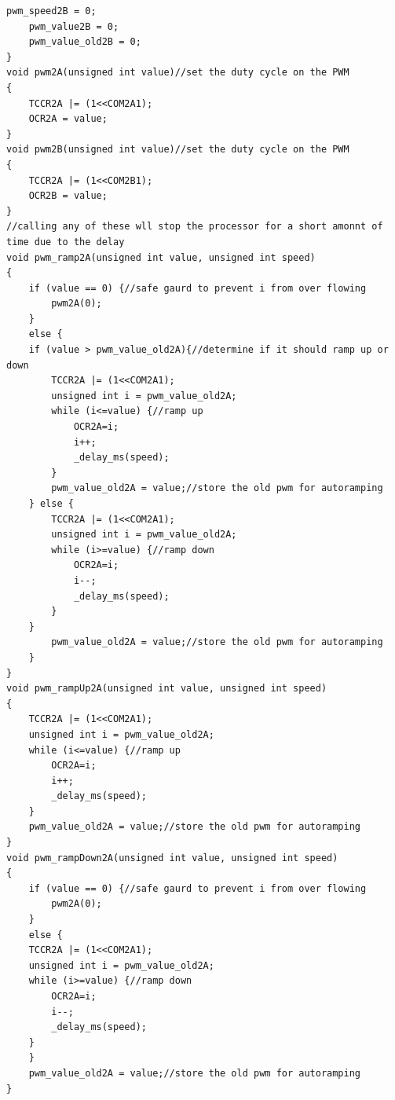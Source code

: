 \documentclass{article}
\begin{document}
\begin{lstlisting}[caption={The PWM function library.},label=pwm,frame=tbl]
    pwm_speed2B = 0;
    pwm_value2B = 0;
    pwm_value_old2B = 0;
}
void pwm2A(unsigned int value)//set the duty cycle on the PWM
{
    TCCR2A |= (1<<COM2A1);
    OCR2A = value;
}
void pwm2B(unsigned int value)//set the duty cycle on the PWM
{
    TCCR2A |= (1<<COM2B1);
    OCR2B = value;
}
//calling any of these wll stop the processor for a short amonnt of time due to the delay
void pwm_ramp2A(unsigned int value, unsigned int speed)
{
    if (value == 0) {//safe gaurd to prevent i from over flowing
        pwm2A(0);
    }
    else {
    if (value > pwm_value_old2A){//determine if it should ramp up or down
        TCCR2A |= (1<<COM2A1);
        unsigned int i = pwm_value_old2A;
        while (i<=value) {//ramp up
            OCR2A=i;
            i++;
            _delay_ms(speed);
        }
        pwm_value_old2A = value;//store the old pwm for autoramping
    } else {
        TCCR2A |= (1<<COM2A1);
        unsigned int i = pwm_value_old2A;
        while (i>=value) {//ramp down
            OCR2A=i;
            i--;
            _delay_ms(speed);
        }
    }
        pwm_value_old2A = value;//store the old pwm for autoramping
    }
}
void pwm_rampUp2A(unsigned int value, unsigned int speed)
{
    TCCR2A |= (1<<COM2A1);
    unsigned int i = pwm_value_old2A;
    while (i<=value) {//ramp up
        OCR2A=i;
        i++;
        _delay_ms(speed);
    }
    pwm_value_old2A = value;//store the old pwm for autoramping
}
void pwm_rampDown2A(unsigned int value, unsigned int speed)
{
    if (value == 0) {//safe gaurd to prevent i from over flowing
        pwm2A(0);
    }
    else {
    TCCR2A |= (1<<COM2A1);
    unsigned int i = pwm_value_old2A;
    while (i>=value) {//ramp down
        OCR2A=i;
        i--;
        _delay_ms(speed);
    }
    }
    pwm_value_old2A = value;//store the old pwm for autoramping
}



\end{lstlisting}
\end{document}
